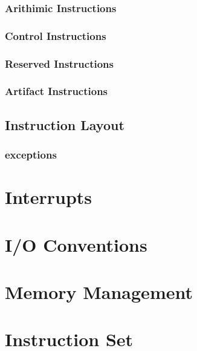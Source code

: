\documentclass[twoside,a4paper]{memoir}
\begin{document}
\subsection{Arithimic Instructions}
\subsection{Control Instructions}
\subsection{Reserved Instructions}
\subsection{Artifact Instructions}
\section{Instruction Layout}
\subsection{exceptions}

\chapter{Interrupts}

\chapter{I/O Conventions}

\chapter{Memory Management}

\chapter{Instruction Set}

\appendix
\end{document}
